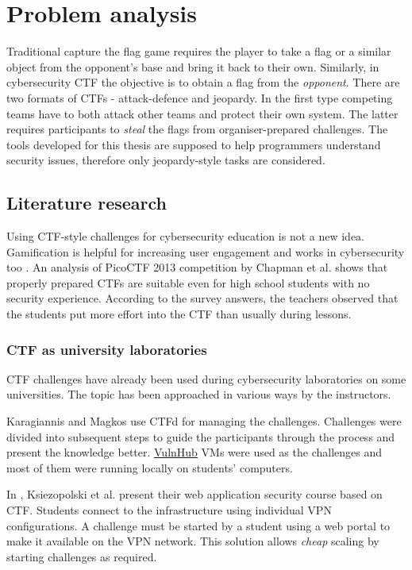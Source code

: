 \chapter{Problem analysis}
\label{chap:problem-analysis}

Traditional capture the flag game requires the player to take a flag or a similar object from the opponent's base and bring it back to their own. Similarly, in cybersecurity CTF the objective is to obtain a flag from the \textit{opponent}. There are two formats of CTFs - attack-defence and jeopardy. In the first type competing teams have to both attack other teams and protect their own system. The latter requires participants to \textit{steal} the flags from organiser-prepared challenges. The tools developed for this thesis are supposed to help programmers understand security issues, therefore only jeopardy-style tasks are considered.

\section{Literature research}

Using CTF-style challenges for cybersecurity education is not a new idea. Gamification is helpful for increasing user engagement and works in cybersecurity too \cite{bib:exploring-game-design}. An analysis of PicoCTF 2013 competition by Chapman et al. \cite{bib:picoCTF} shows that properly prepared CTFs are suitable even for high school students with no security experience. According to the survey answers, the teachers observed that the students put more effort into the CTF than usually during lessons.

\subsection{CTF as university laboratories}

CTF challenges have already been used during cybersecurity laboratories on some universities. The topic has been approached in various ways by the instructors.

Karagiannis and Magkos \cite{bib:Karagiannis2021} use CTFd for managing the challenges. Challenges were divided into subsequent steps to guide the participants through the process and present the knowledge better. \href{https://vulnhub.com/}{VulnHub} VMs were used as the challenges and most of them were running locally on students' computers.

In \cite{bib:teaching-ctf-PL}, Ksiezopolski et al. present their web application security course based on CTF. Students connect to the infrastructure using individual VPN configurations. A challenge must be started by a student using a web portal to make it available on the VPN network. This solution allows \textit{cheap} scaling by starting challenges as required.

